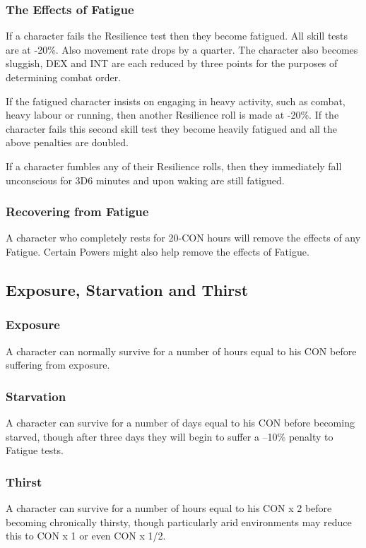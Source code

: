 \subsubsection{The Effects of Fatigue}
If a character fails the Resilience test then they become fatigued. All skill tests are at -20\%. Also movement rate drops by a quarter. The character also becomes sluggish, DEX and INT are each reduced by three points for the purposes of determining combat order.

If the fatigued character insists on engaging in heavy activity, such as combat, heavy labour or running, then another Resilience roll is made at -20\%. If the character fails this second skill test they become heavily fatigued and all the above penalties are doubled.

If a character fumbles any of their Resilience rolls, then they immediately fall unconscious for 3D6 minutes and upon waking are still fatigued.

\subsubsection{Recovering from Fatigue}
A character who completely rests for 20-CON hours will remove the effects of any Fatigue. Certain Powers might also help remove the effects of Fatigue.


\subsection{Exposure, Starvation and Thirst}

\subsubsection{Exposure}
A character can normally survive for a number of hours equal to his CON before suffering from exposure. 

\subsubsection{Starvation}
A character can survive for a number of days equal to his CON before becoming starved, though after three days they will begin to suffer a –10\% penalty to Fatigue tests. 

\subsubsection{Thirst}
A character can survive for a number of hours equal to his CON x 2 before becoming chronically thirsty, though particularly arid environments may reduce this to CON x 1 or even CON x 1/2. 

